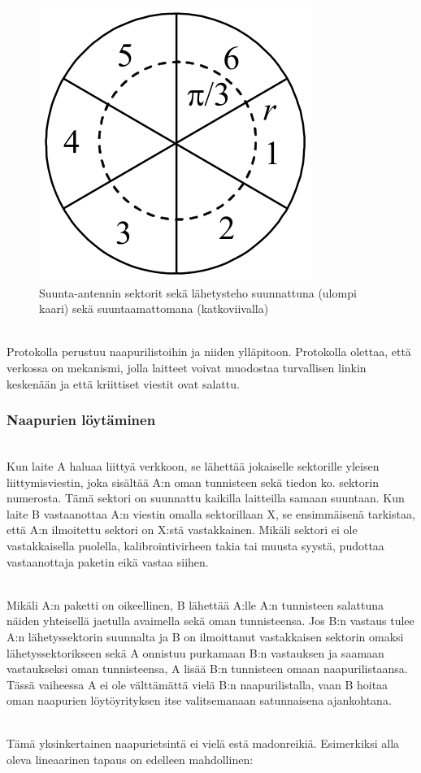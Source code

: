 \documentclass[finnish]{tktltiki2}
\theoremstyle{definition}
\theoremstyle{remark}
\begin{document}
\begin{figure}[h]
  \centering
  \includegraphics[width=0.25\linewidth]{directional-antenna-layout}
  \caption{Suunta-antennin sektorit sekä lähetysteho suunnattuna (ulompi kaari) sekä suuntaamattomana (katkoviivalla) \cite{antenna}}
  \label{fig:directional-layout}
\end{figure}

\noindent \\
Protokolla perustuu naapurilistoihin ja niiden ylläpitoon. Protokolla olettaa, että verkossa on mekanismi, jolla laitteet voivat muodostaa turvallisen linkin keskenään ja että kriittiset viestit ovat salattu.

\subsubsection{Naapurien löytäminen}
\noindent\\
Kun laite A haluaa liittyä verkkoon, se lähettää jokaiselle sektorille yleisen liittymisviestin, joka sisältää A:n oman tunnisteen sekä tiedon ko. sektorin numerosta. Tämä sektori on suunnattu kaikilla laitteilla samaan suuntaan. Kun laite B vastaanottaa A:n viestin omalla sektorillaan X, se ensimmäisenä tarkistaa, että A:n ilmoitettu sektori on X:stä vastakkainen. Mikäli sektori ei ole vastakkaisella puolella, kalibrointivirheen takia tai muusta syystä, pudottaa vastaanottaja paketin eikä vastaa siihen.

\noindent\\
Mikäli A:n paketti on oikeellinen, B lähettää A:lle A:n tunnisteen salattuna näiden yhteisellä jaetulla avaimella sekä oman tunnisteensa. Jos B:n vastaus tulee A:n lähetyssektorin suunnalta ja  B on ilmoittanut vastakkaisen sektorin omaksi lähetyssektorikseen sekä A onnistuu purkamaan B:n vastauksen ja saamaan vastaukseksi oman tunnisteensa, A lisää B:n tunnisteen omaan naapurilistaansa. Tässä vaiheessa A ei ole välttämättä vielä B:n naapurilistalla, vaan B hoitaa oman naapurien löytöyrityksen itse valitsemanaan satunnaisena ajankohtana.

\noindent\\
Tämä yksinkertainen naapurietsintä ei vielä estä madonreikiä. Esimerkiksi alla oleva lineaarinen tapaus on edelleen mahdollinen:
\end{document}
